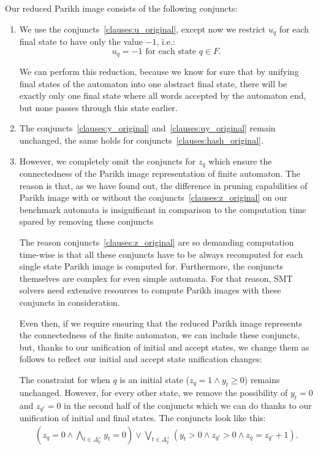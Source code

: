 Our reduced Parikh image consists of the following conjuncts:
\begin{enumerate}
    \item \label{clauses:u_reduced} We use the conjuncts~\ref{clauses:u_original}, except now we restrict $u_q$ for each final state to have only the value $-1$, i.e.:
    $$ u_{q} = -1 \text{ for each state } q \in F \text{.}$$

    We can perform this reduction, because we know for sure that by unifying final states of the automaton into one abstract final state, there will be exactly only one final state where all words accepted by the automaton end, but none passes through this state earlier.

    \item \label{clauses:y_reduced} \label{clauses:uy_reduced} \label{clauses:hash_reduced} The conjuncts~\ref{clauses:y_original} and~\ref{clauses:uy_original} remain unchanged, the same holds for conjuncts~\ref{clauses:hash_original}.

    \item \label{clauses:z_reduced} However, we completely omit the conjuncts for $z_{q}$ which ensure the connectedness of the Parikh image representation of finite automaton. The reason is that, as we have found out, the difference in pruning capabilities of Parikh image with or without the conjuncts~\ref{clauses:z_original} on our benchmark automata is insignificant in comparison to the computation time spared by removing these conjuncts %

    The reason conjuncts~\ref{clauses:z_original} are so demanding computation time-wise is that all these conjuncts have to be always recomputed for each single state Parikh image is computed for. Furthermore, the conjuncts themselves are complex for even simple automata. For that reason, SMT solvers need extensive resources to compute Parikh images with these conjuncts in consideration.

    Even then, if we require ensuring that the reduced Parikh image represents the connectedness of the finite automaton, we can include these conjuncts, but, thanks to our unification of initial and accept states, we change them as follows to reflect our initial and accept state unification changes:

    The constraint for when $q$ is an initial state ($z_q = 1 \land y_t \geq 0$) remains unchanged. However, for every other state, we remove the possibility of $y_t = 0$ and $z_{q'} = 0$ in the second half of the conjuncts which we can do thanks to our unification of initial and final states. The conjuncts look like this:
    {
    \begin{align*}
		(z_q = 0 \land \bigwedge_{t \in \Delta_q^+} y_t = 0) \lor \bigvee_{t \in \Delta_q^+} (y_t > 0 \land z_{q'} > 0 \land z_q = z_{q'} + 1) \text{.}
    \end{align*}
    }

\end{enumerate}

